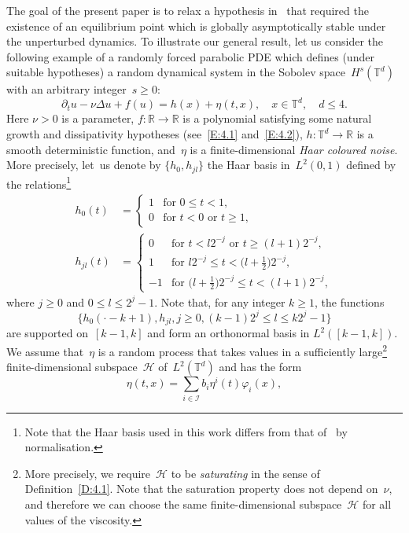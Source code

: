 \documentclass[11pt]{article}
\theoremstyle{plain}
\theoremstyle{definition}
\let\mathcal\mathscr
\theoremstyle{plain}
\numberwithin{equation}{section}
\let\p\partial
\newcommand{\R}{{\mathbb R}}
\newcommand{\T}{{\mathbb T}}
\newcommand{\HH}{{\mathcal H}}
\newcommand{\II}{{\mathcal I}}
\begin{document}
The goal of the present paper is to relax a hypothesis in~\cite{KNS-2020} that required the existence of an equilibrium point which is globally asymptotically stable under the unperturbed dynamics. To illustrate our general result, let us consider the following example of a randomly forced parabolic PDE which defines (under suitable hypotheses) a random dynamical system in the Sobolev space~$H^s(\T^d)$ with an arbitrary integer~$s\ge0$:
\begin{equation} \label{rf-pde}
\p_t u-\nu\Delta u+f(u)=h(x)+\eta(t,x), \quad x\in\T^d, \quad d\le 4.
\end{equation}
Here $\nu>0$ is a parameter, $f:\R\to\R$ is a polynomial satisfying some natural growth and dissipativity hypotheses (see~\eqref{E:4.1} and~\eqref{E:4.2}), $h: \T^d\to \R$ is a smooth deterministic function, and~$\eta$ is a finite-dimensional \emph{Haar coloured noise}. More precisely, let~us denote by $\{h_0,h_{jl}\}$ the Haar basis in~$L^2(0,1)$ defined by the relations\footnote{Note that the Haar basis used in this work differs from that of~\cite[\S 22]{lamperti1996} by normalisation.}
\begin{align*}
h_0(t)&=
\begin{cases}
1 & \text{for $0\le t<1$},\\
0 & \text{for $t<0$ or $t\ge1$},
\end{cases}
\\
h_{jl}(t)&=
\begin{cases}
0 & \text{for $t<l2^{-j}$ or $t\ge (l+1)2^{-j}$},\\
1 & \text{for $l2^{-j}\le t<\bigl(l+\tfrac12\bigr)2^{-j}$},\\
-1 & \text{for $\bigl(l+\tfrac12\bigr)2^{-j}\le t<(l+1)2^{-j}$},
\end{cases}
\end{align*}
where $j\ge0$ and $0\le l\le 2^j-1$. Note that, for any integer $k\ge1$, the functions
\[
\bigl\{h_0(\cdot-k+1),h_{jl}, j\ge0,(k-1)2^j\le l\le k2^j-1\bigr\}
\]
are supported on~$[k-1,k]$ and form an orthonormal basis in $L^2([k-1,k])$. We assume that~$\eta$ is a random process that takes values in a sufficiently large\footnote{More precisely, we require~$\HH$ to be \emph{saturating} in the sense of Definition~\ref{D:4.1}. Note that the saturation property does not depend on~$\nu$, and therefore we can choose the same finite-dimensional subspace~$\HH$ for all values of the viscosity.} finite-dimensional subspace~$\HH$ of~$L^2(\T^d)$ and has the form
\begin{equation} \label{eta-intro}
\eta(t,x)= \sum_{i\in\II}b_i \eta^i(t)\varphi_i(x),
\end{equation}
\end{document}

